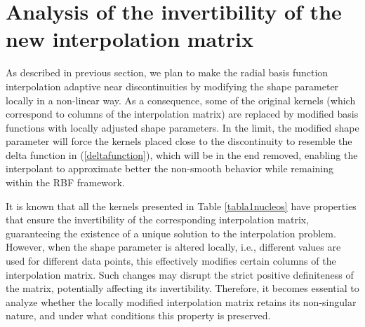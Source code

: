 \documentclass[preprint]{elsarticle}       %
\begin{document}
\section{Analysis of the invertibility of the new interpolation matrix}
As described in previous section, we plan to make the radial basis function  interpolation adaptive near discontinuities by modifying the shape parameter locally in a non-linear way.  As a consequence, some of the original kernels (which correspond to columns of the interpolation matrix) are replaced by modified basis functions with locally adjusted shape parameters. In the limit, the modified shape parameter will force the kernels placed close to the discontinuity to resemble the delta function in (\ref{deltafunction}), which will be in the end removed, enabling the interpolant to approximate better the non-smooth behavior while remaining within the RBF framework.

It is known \cite{Micchelli1986, Fasshauer2007} that all the kernels presented in Table \ref{tabla1nucleos} have properties that ensure the invertibility of the corresponding interpolation matrix, guaranteeing the existence of a unique solution to the interpolation problem. However, when the shape parameter is altered locally, i.e., different values are used for different data points, this effectively modifies certain columns of the interpolation matrix. Such changes may disrupt the strict positive definiteness of the matrix, potentially affecting its invertibility. Therefore, it becomes essential to analyze whether the locally modified interpolation matrix retains its non-singular nature, and under what conditions this property is preserved.
\end{document}
